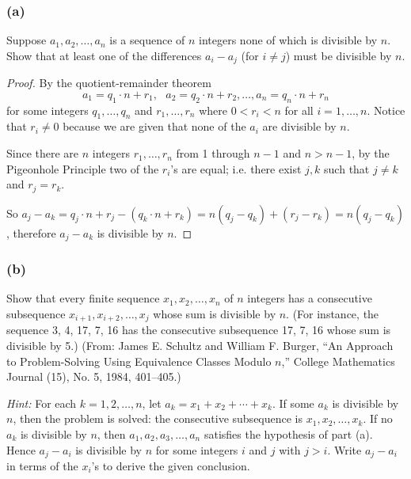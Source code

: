 \documentclass[14pt]{extarticle}
\begin{document}
\subsubsection{(a)}
Suppose \(a_1, a_2, \ldots, a_n\) is a sequence of \(n\) integers none of which is divisible by \(n\). Show that at
least one of the differences \(a_i - a_j\) (for \(i \neq j\)) must be divisible by \(n\).

\begin{proof}
     By the quotient-remainder theorem
     \[
          a_1 = q_1 \cdot n + r_1, \,\,\,\, a_2 = q_2 \cdot n + r_2,  \ldots, a_n = q_n \cdot n + r_n
     \]
     for some integers \(q_1, \ldots, q_n\) and \(r_1, \ldots, r_n\) where \(0 < r_i < n\) for all \(i = 1,\ldots,n\).
     Notice that \(r_i \neq 0\) because we are given that none of the \(a_i\) are divisible by \(n\).

     Since there are \(n\) integers \(r_1, \ldots, r_n\) from 1 through \(n-1\) and \(n > n-1\), by the Pigeonhole
     Principle two of the \(r_i\)'s are equal; i.e. there exist \(j, k\) such that \(j \neq k\) and \(r_j = r_k\).

     So \(a_j - a_k = q_j \cdot n + r_j - (q_k \cdot n + r_k) = n(q_j - q_k) + (r_j - r_k) = n(q_j-q_k)\), therefore
     \(a_j-a_k\) is divisible by \(n\).
\end{proof}

\subsubsection{(b)}
Show that every finite sequence \(x_1, x_2, \ldots, x_n\) of \(n\) integers has a consecutive subsequence
\(x_{i+1}, x_{i+2}, \ldots, x_j\) whose sum is divisible by \(n\). (For instance, the sequence 3, 4, 17, 7, 16 has the
consecutive subsequence 17, 7, 16 whose sum is divisible by 5.) (From: James E. Schultz and William F. Burger, “An
Approach to Problem-Solving Using Equivalence Classes Modulo \(n\),” College Mathematics Journal (15), No. 5,
1984, 401–405.)

{\it Hint:} For each \(k = 1, 2, \ldots, n\), let \(a_k = x_1 + x_2 + \cdots + x_k\). If some \(a_k\) is divisible by
\(n\), then the problem is solved: the consecutive subsequence is \(x_1, x_2, \ldots, x_k\). If no \(a_k\) is
divisible by \(n\), then \(a_1, a_2, a_3, \ldots, a_n\) satisfies the hypothesis of part (a). Hence \(a_j - a_i\)
is divisible by \(n\) for some integers \(i\) and \(j\) with \(j > i\). Write \(a_j - a_i\) in terms of the
\(x_i\)’s to derive the given conclusion.
\end{document}

